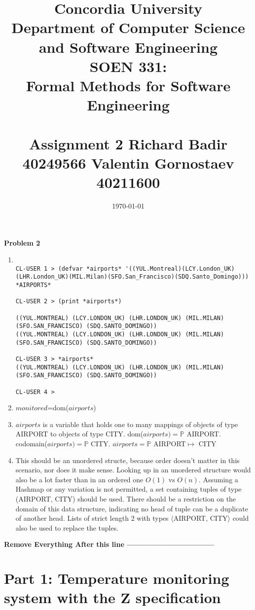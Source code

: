 \documentclass[12pt]{article}
\title{Concordia University\\
Department of Computer Science and Software Engineering\\
\textbf{SOEN 331:\\Formal Methods for Software Engineering}\\
\ \\
\textbf{Assignment 2}
\textbf{Richard Badir 40249566}
\textbf{Valentin Gornostaev 40211600}}
\date{\today}
\begin{document}
\maketitle
\newpage

\textbf{Problem 2}
\begin{enumerate}
\item
\begin{verbatim}

CL-USER 1 > (defvar *airports* '((YUL.Montreal)(LCY.London_UK)(LHR.London_UK)(MIL.Milan)(SFO.San_Francisco)(SDQ.Santo_Domingo)))
*AIRPORTS*

CL-USER 2 > (print *airports*)

((YUL.MONTREAL) (LCY.LONDON_UK) (LHR.LONDON_UK) (MIL.MILAN) (SFO.SAN_FRANCISCO) (SDQ.SANTO_DOMINGO)) 
((YUL.MONTREAL) (LCY.LONDON_UK) (LHR.LONDON_UK) (MIL.MILAN) (SFO.SAN_FRANCISCO) (SDQ.SANTO_DOMINGO))

CL-USER 3 > *airports*
((YUL.MONTREAL) (LCY.LONDON_UK) (LHR.LONDON_UK) (MIL.MILAN) (SFO.SAN_FRANCISCO) (SDQ.SANTO_DOMINGO))

CL-USER 4 > 
\end{verbatim}
\item $monitored$=dom($airports$)
\item $airports$ is a variable that holds one to many mappings of objects of type AIRPORT to objects of type CITY. dom($airports)=\mathbb{P}$ AIRPORT. codomain($airports)= \mathbb{P}$ CITY. $airports = \mathbb{P}$ AIRPORT$\mapsto$ CITY
\item This should be an unordered structe, because order doesn't matter in this scenario, nor does it make sense. Looking up in an unordered structure would also be a lot faster than in an ordered one $O(1)$ vs $O(n)$. Assuming a Hashmap or any variation is not permitted, a set containing tuples of type (AIRPORT, CITY) should be used. There should be a restriction on the domain of this data structure, indicating no head of tuple can be a duplicate of another head. Lists of strict length 2 with types $\langle$AIRPORT, CITY$\rangle$ could also be used to replace the tuples.
\end{enumerate}


\textbf{Remove Everything After this line ---------------------------------}\\
\newpage

\section*{Part 1:  Temperature monitoring system with the Z specification}
\end{document}
